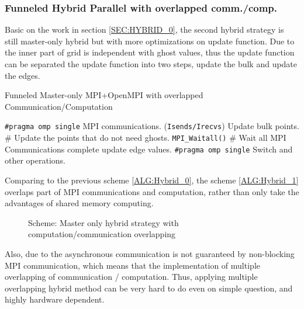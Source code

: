 \subsubsection{Funneled Hybrid Parallel with overlapped comm./comp.}\label{SEC:HYBRID_1}
Basic on the work in section \ref{SEC:HYBRID_0}, the second hybrid strategy is still master-only hybrid but with more optimizations on update 
function. 
Due to the inner part of grid is independent with ghost values, thus the update function can be separated the update function into two steps, 
update the bulk and update the edges.

\begin{algorithm}
  \caption{Funneled Master-only MPI+OpenMPI with overlapped Communication/Computation}
  \label{ALG:Hybrid_1}
  \begin{algorithmic}[1]
      \STATE \texttt{\#pragma omp single}
      \STATE MPI communications. (\texttt{Isends/Irecvs})
        \STATE Update bulk points.                                  \hfill \# Update the points that do not need ghosts.
      \ENDFOR
      \STATE \texttt{MPI\_Waitall()}                                \hfill \# Wait all MPI Communications complete
        \STATE update edge values.                                 
      \ENDFOR
      \STATE \texttt{\#pragma omp single} Switch and other operations.
    \ENDFOR
  \end{algorithmic}
\end{algorithm}
Comparing to the previous scheme \ref{ALG:Hybrid_0}, the scheme \ref{ALG:Hybrid_1} overlaps part of MPI communications and computation, 
rather than only take the advantages of shared memory computing.

\begin{figure}[htbp]
  \centering
  \caption{Scheme: Master only hybrid strategy with computation/communication overlapping}
  \label{FIG:master_only_hybrid_1}
\end{figure}
Also, due to the asynchronous communication is not guaranteed by non-blocking MPI communication,
which means that the implementation of multiple overlapping of communication / computation.
Thus, applying multiple overlapping hybrid method can be very hard to do even on simple question, and highly hardware dependent.


